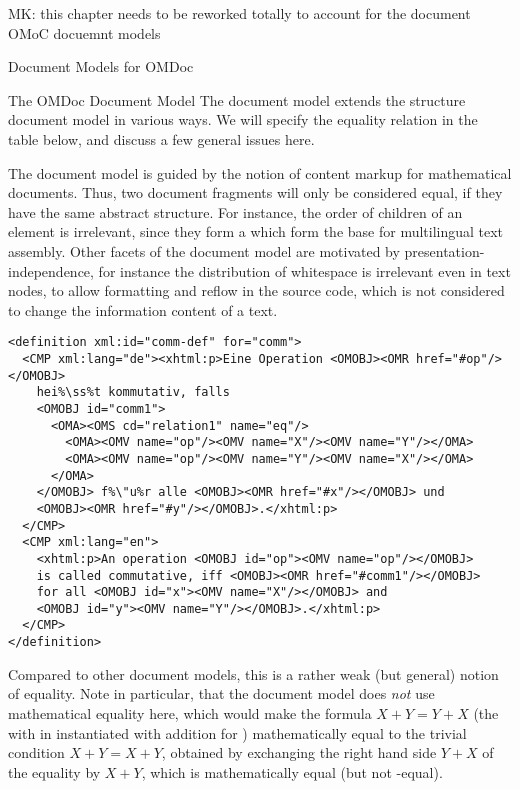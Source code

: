 \begin{oldpart}{MK: this chapter needs to be reworked totally to account for the document
    OMoC docuemnt models}
\begin{tchapter}[id=document-model]{Document Models for OMDoc}
\begin{tsection}[id=omdom]{The OMDoc Document Model}
  The {\omdoc} document model extends the {\xml} structure document model in various ways.
  We will specify the equality relation in the table below, and discuss a few general
  issues here.

  The {\omdoc} document model is guided by the notion of content markup for mathematical
  documents. Thus, two document fragments will only be considered equal, if they have the
  same abstract structure. For instance, the order of {} children of an
  {} element is irrelevant, since they form a
  {} which form the base for multilingual text
  assembly. Other facets of the {\omdoc} document model are motivated by
  presentation-independence, for instance the distribution of whitespace is irrelevant
  even in text nodes, to allow formatting and reflow in the source code, which is not
  considered to change the information content of a text.

\begin{lstlisting}[escapechar=\%,label=lst:third,
   index={definition,CMP,OMOBJ,OMA},
   caption={An {\omdoc}-Equal Representation for {\mylstsref{first}{second}}}]
<definition xml:id="comm-def" for="comm">
  <CMP xml:lang="de"><xhtml:p>Eine Operation <OMOBJ><OMR href="#op"/></OMOBJ> 
    hei%\ss%t kommutativ, falls 
    <OMOBJ id="comm1">
      <OMA><OMS cd="relation1" name="eq"/>
        <OMA><OMV name="op"/><OMV name="X"/><OMV name="Y"/></OMA>
        <OMA><OMV name="op"/><OMV name="Y"/><OMV name="X"/></OMA>
      </OMA>
    </OMOBJ> f%\"u%r alle <OMOBJ><OMR href="#x"/></OMOBJ> und 
    <OMOBJ><OMR href="#y"/></OMOBJ>.</xhtml:p>
  </CMP>
  <CMP xml:lang="en">
    <xhtml:p>An operation <OMOBJ id="op"><OMV name="op"/></OMOBJ>
    is called commutative, iff <OMOBJ><OMR href="#comm1"/></OMOBJ>
    for all <OMOBJ id="x"><OMV name="X"/></OMOBJ> and 
    <OMOBJ id="y"><OMV name="Y"/></OMOBJ>.</xhtml:p>
  </CMP>
</definition>
\end{lstlisting}

Compared to other document models, this is a rather weak (but general) notion of
equality. Note in particular, that the {\omdoc} document model does {\emph{not}}
use mathematical equality here, which would make the formula $X+Y=Y+X$ (the
{} with {} in
{} instantiated with addition for {}) mathematically
equal to the trivial condition $X+Y=X+Y$, obtained by exchanging the right hand
side $Y+X$ of the equality by $X+Y$, which is mathematically equal (but not
{\omdoc}-equal).


\end{tsection}
\end{tchapter}
\end{oldpart}
